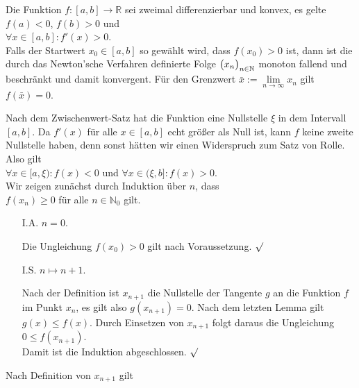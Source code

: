 \begin{Satz} \lb
  Die Funktion $f:[a,b] \rightarrow \mathbb{R}$ sei zweimal differenzierbar und konvex, es gelte
  $f(a) < 0$, $f(b) > 0$ und 
  \\[0.2cm]
  \hspace*{1.3cm}
  $\forall x \in [a,b]: f'(x) > 0$.
  \\[0.2cm]
  Falls der Startwert $x_0 \in [a,b]$ so gew\"ahlt wird, dass $f(x_0) > 0$ ist, 
  dann ist die durch das Newton'sche Verfahren definierte Folge $\bigl(x_n\bigr)_{n\in\mathbb{N}}$ monoton fallend und
  beschr\"ankt und damit konvergent.  F\"ur den Grenzwert
  $\bar{x} := \lim\limits_{n\rightarrow\infty} x_n$
  gilt $f(\bar{x}) = 0$.
\end{Satz}

\proof
Nach dem Zwischenwert-Satz hat die Funktion eine Nullstelle $\xi$ in dem Intervall $[a,b]$.  Da 
$f'(x)$ f\"ur alle $x \in [a,b]$ echt gr\"o{\ss}er als Null ist, kann $f$ keine zweite Nullstelle haben, denn
sonst h\"atten wir einen Widerspruch zum Satz von Rolle.  Also gilt
\\[0.2cm]
\hspace*{1.3cm}
$\forall x \in [a,\xi): f(x) < 0$ \quad und \quad
$\forall x \in (\xi,b]: f(x) > 0$.
\\[0.2cm]
Wir zeigen zun\"achst durch Induktion \"uber $n$, dass 
\\[0.2cm]
\hspace*{1.3cm}
$f(x_n) \geq 0$ \quad f\"ur alle $n \in \mathbb{N}_0$ gilt.  
\begin{enumerate}
\item[I.A.] $n=0$.  

            Die Ungleichung $f(x_0) > 0$  gilt nach Voraussetzung. $\surd$
\item[I.S.] $n \mapsto n+1$.

            Nach der Definition ist $x_{n+1}$ die Nullstelle der Tangente $g$ an die Funktion $f$
            im Punkt $x_n$, es gilt also $g(x_{n+1}) = 0$.  Nach dem letzten Lemma gilt $g(x) \leq f(x)$.  
            Durch Einsetzen von $x_{n+1}$ folgt daraus die Ungleichung
            \\[0.2cm]
            \hspace*{1.3cm}
            $0 \leq f(x_{n+1})$.
            \\[0.2cm]
            Damit ist die Induktion abgeschlossen. $\surd$
\end{enumerate}
Nach Definition von $x_{n+1}$ gilt
